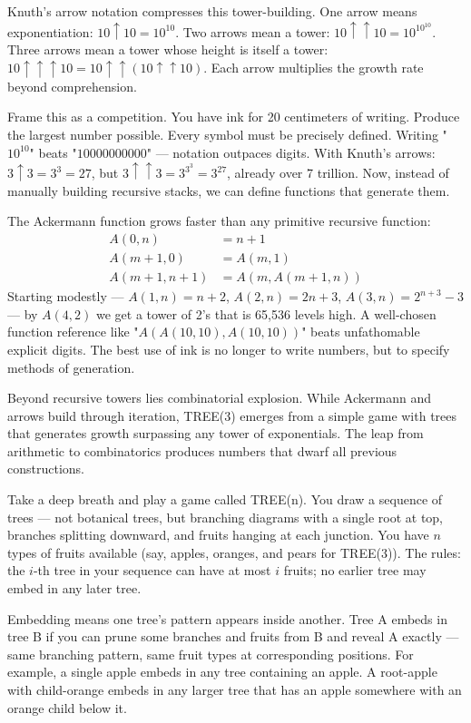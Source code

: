 Knuth's arrow notation compresses this tower-building. One arrow means exponentiation: $10 \uparrow 10 = 10^{10}$. Two arrows mean a tower: $10 \uparrow\uparrow 10 = 10^{10^{10}}$. Three arrows mean a tower whose height is itself a tower: $10 \uparrow\uparrow\uparrow 10 = 10 \uparrow\uparrow (10 \uparrow\uparrow 10)$. Each arrow multiplies the growth rate beyond comprehension.

Frame this as a competition. You have ink for 20 centimeters of writing. Produce the largest number possible. Every symbol must be precisely defined. Writing "$10^{10}$" beats "$10000000000$" — notation outpaces digits. With Knuth's arrows: $3 \uparrow 3 = 3^3 = 27$, but $3 \uparrow\uparrow 3 = 3^{3^3} = 3^{27}$, already over 7 trillion. Now, instead of manually building recursive stacks, we can define functions that generate them.

The Ackermann function grows faster than any primitive recursive function:
\[
\begin{aligned}
A(0,n) &= n+1 \\
A(m+1,0) &= A(m,1) \\
A(m+1,n+1) &= A(m, A(m+1,n))
\end{aligned}
\]
Starting modestly — $A(1,n) = n+2$, $A(2,n) = 2n+3$, $A(3,n) = 2^{n+3} - 3$ — by $A(4,2)$ we get a tower of 2's that is 65,536 levels high. A well-chosen function reference like "$A(A(10,10),A(10,10))$" beats unfathomable explicit digits. The best use of ink is no longer to write numbers, but to specify methods of generation.

Beyond recursive towers lies combinatorial explosion. While Ackermann and arrows build through iteration, TREE(3) emerges from a simple game with trees that generates growth surpassing any tower of exponentials. The leap from arithmetic to combinatorics produces numbers that dwarf all previous constructions.

Take a deep breath and play a game called TREE(n). You draw a sequence of trees — not botanical trees, but branching diagrams with a single root at top, branches splitting downward, and fruits hanging at each junction. You have $n$ types of fruits available (say, apples, oranges, and pears for TREE(3)). The rules: the $i$-th tree in your sequence can have at most $i$ fruits; no earlier tree may embed in any later tree.

Embedding means one tree's pattern appears inside another. Tree A embeds in tree B if you can prune some branches and fruits from B and reveal A exactly — same branching pattern, same fruit types at corresponding positions. For example, a single apple embeds in any tree containing an apple. A root-apple with child-orange embeds in any larger tree that has an apple somewhere with an orange child below it.

